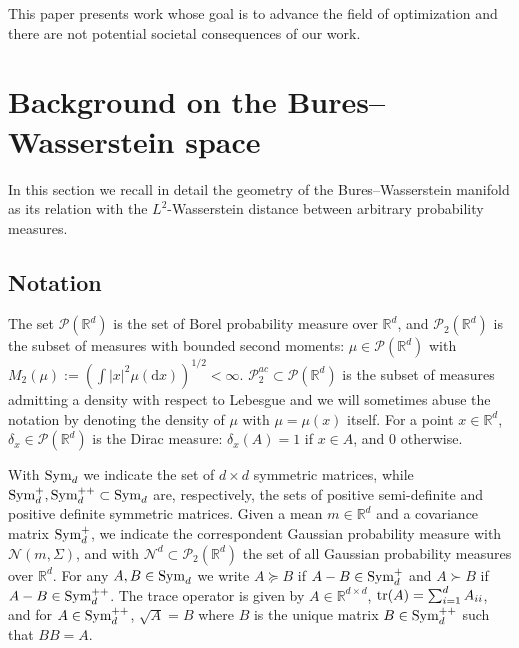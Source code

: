 \documentclass{article}
\theoremstyle{plain}
\theoremstyle{definition}
\theoremstyle{remark}
\newcommand{\Rd}{ {\mathbb{R}^d}}
\newcommand{\R}{ \mathbb{R}}
\renewcommand{\d}{\mathrm{d}}
\newcommand{\sym}{\textup{Sym}_d}
\newcommand{\pd}{\textup{Sym}^{++}_d}
\newcommand{\psd}{\textup{Sym}^{+}_d}
\newcommand{\tr}{\textup{tr}}
\begin{document}
This paper presents work whose goal is to advance the field of optimization and there are not potential societal consequences of our work.

\nocite{langley00}




\newpage
\appendix
\onecolumn

\section{Background on the Bures--Wasserstein space}
\label{sec:2}

In this section we recall in detail the geometry of the Bures--Wasserstein manifold as its relation with the $L^2$-Wasserstein distance between arbitrary probability measures.

\subsection{Notation} 
The set $\mathcal{P}(\Rd)$ is the set of Borel probability measure over $\Rd$, and $\mathcal{P}_2(\Rd)$ is the subset of measures with bounded second moments: $\mu \in \mathcal{P}(\Rd)$ with $M_2(\mu):= (\int |x|^2 \mu(\d x))^{1/2} < \infty$. $\mathcal{P}_2^{ac}\subset \mathcal{P}(\Rd)$ is the subset of measures admitting a density with respect to Lebesgue and we will sometimes abuse the notation by denoting the density of $\mu$ with $\mu = \mu(x)$ itself. For a point $x\in \Rd$, $\delta_x\in \mathcal{P}(\Rd)$ is the Dirac measure: $\delta_x(A) = 1$ if $x\in A$, and $0$ otherwise.

With $\sym$ we indicate the set of $d\times d$ symmetric matrices, while $\psd, \pd \subset \sym$ are, respectively, the sets of positive semi-definite and positive definite symmetric matrices. Given a mean  $m\in \Rd$ and a covariance matrix $\psd$, we indicate the correspondent Gaussian probability measure with $\mathcal{N}(m,\Sigma)$, and with $\mathcal{N}^d\subset \mathcal{P}_2(\Rd)$ the set of all Gaussian probability measures over $\Rd$. For any $A,B\in \sym$ we write $A\succeq B$ if $A - B \in \psd$ and $A\succ B$ if $A - B \in \pd$. The trace operator is given by $A\in \R^{d\times d}$, $\tr(A) = \sum_{i=1}^d A_{ii}$, and for $A\in \pd$, $\sqrt{A} = B$ where $B $ is the unique matrix $B \in \pd$ such that $BB = A$.
\end{document}
